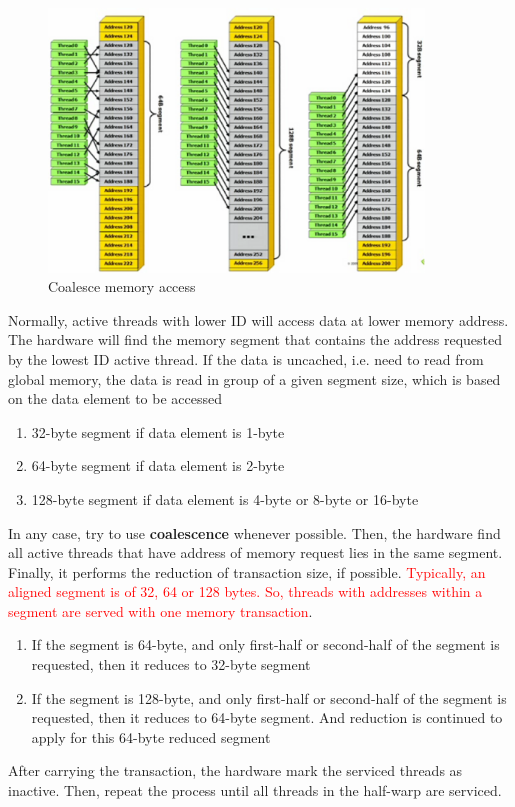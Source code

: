\begin{figure}[hbt]
  \centerline{\includegraphics[height=7cm,
    angle=0]{./images/coalesce_memory.eps}}
  \caption{Coalesce memory access}
  \label{fig:coalescing}
\end{figure}

Normally, active threads with lower ID will access data at lower
memory address. The hardware will find the memory segment that
contains the address requested by the lowest ID active thread. If the
data is uncached, i.e. need to read from global memory, the data is
read in group of a given segment size, which is based on the data
element to be accessed
\begin{enumerate}
\item 32-byte segment if data element is 1-byte
\item 64-byte segment if data element is 2-byte
\item 128-byte segment if data element is 4-byte or 8-byte or 16-byte
\end{enumerate}
In any case, try to use {\bf coalescence} whenever possible.  Then,
the hardware find all active threads that have address of memory
request lies in the same segment. Finally, it performs the reduction
of transaction size, if possible.
\textcolor{red}{Typically, an aligned segment is of 32, 64 or 128
  bytes. So, threads with addresses within a segment are served with
  one memory transaction}.

\begin{enumerate}
\item If the segment is 64-byte, and only first-half or second-half of
  the segment is requested, then it reduces to 32-byte segment
\item If the segment is 128-byte, and only first-half or second-half
  of the segment is requested, then it reduces to 64-byte segment. And
  reduction is continued to apply for this 64-byte reduced segment
\end{enumerate}
After carrying the transaction, the hardware mark the serviced threads
as inactive. Then, repeat the process until all threads in the
half-warp are serviced. 



